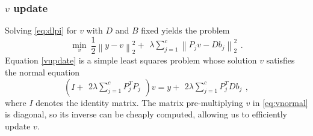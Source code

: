 \vspace{-2mm}
\subsubsection{$v$ update}
Solving \eqref{eq:dlpi} for $v$ with $D$ and $B$ fixed yields the problem
\begin{equation} \label{vupdate}
\min_{v} ~ \frac{1}{2} \left \| y -  v \right \|_2^2 + \begin{matrix} \lambda  \sum_{j=1}^c \left \| P_j v  - D b_j \right \|_2^2 \end{matrix}.
\end{equation}
Equation \eqref{vupdate} is a simple least squares problem whose solution $v$ satisfies the normal equation
\begin{equation}\label{eq:vnormal}
\left ( I + \begin{matrix} 2 \lambda \sum_{j=1}^c P_j^T P_j \end{matrix} \right ) v = y + \begin{matrix} 2 \lambda \sum_{j=1}^c P_j^T D b_j \end{matrix},
\end{equation}
where $I$ denotes the identity matrix. The matrix pre-multiplying $v$ in \eqref{eq:vnormal} is diagonal, so its inverse can be cheaply computed, allowing us to efficiently update $v$.

\vspace{-2mm}
